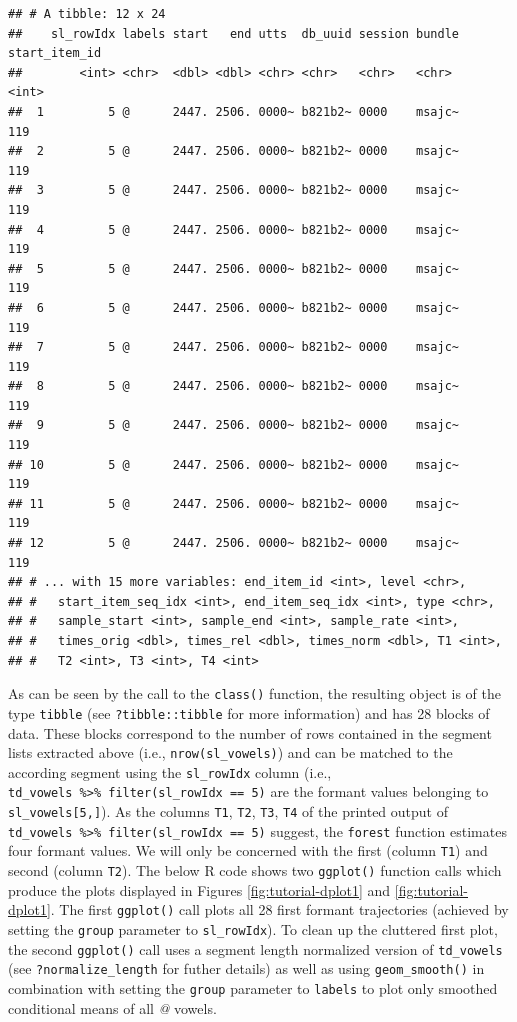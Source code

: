 \documentclass[]{book}
\begin{document}
\begin{verbatim}
## # A tibble: 12 x 24
##    sl_rowIdx labels start   end utts  db_uuid session bundle start_item_id
##        <int> <chr>  <dbl> <dbl> <chr> <chr>   <chr>   <chr>          <int>
##  1         5 @      2447. 2506. 0000~ b821b2~ 0000    msajc~           119
##  2         5 @      2447. 2506. 0000~ b821b2~ 0000    msajc~           119
##  3         5 @      2447. 2506. 0000~ b821b2~ 0000    msajc~           119
##  4         5 @      2447. 2506. 0000~ b821b2~ 0000    msajc~           119
##  5         5 @      2447. 2506. 0000~ b821b2~ 0000    msajc~           119
##  6         5 @      2447. 2506. 0000~ b821b2~ 0000    msajc~           119
##  7         5 @      2447. 2506. 0000~ b821b2~ 0000    msajc~           119
##  8         5 @      2447. 2506. 0000~ b821b2~ 0000    msajc~           119
##  9         5 @      2447. 2506. 0000~ b821b2~ 0000    msajc~           119
## 10         5 @      2447. 2506. 0000~ b821b2~ 0000    msajc~           119
## 11         5 @      2447. 2506. 0000~ b821b2~ 0000    msajc~           119
## 12         5 @      2447. 2506. 0000~ b821b2~ 0000    msajc~           119
## # ... with 15 more variables: end_item_id <int>, level <chr>,
## #   start_item_seq_idx <int>, end_item_seq_idx <int>, type <chr>,
## #   sample_start <int>, sample_end <int>, sample_rate <int>,
## #   times_orig <dbl>, times_rel <dbl>, times_norm <dbl>, T1 <int>,
## #   T2 <int>, T3 <int>, T4 <int>
\end{verbatim}

As can be seen by the call to the \texttt{class()} function, the resulting object is of the type \texttt{tibble} (see \texttt{?tibble::tibble} for more information) and has 28 blocks of data. These blocks correspond to the number of rows contained in the segment lists extracted above (i.e., \texttt{nrow(sl\_vowels)}) and can be matched to the according segment using the \texttt{sl\_rowIdx} column (i.e., \texttt{td\_vowels\ \%\textgreater{}\%\ filter(sl\_rowIdx\ ==\ 5)} are the formant values belonging to \texttt{sl\_vowels{[}5,{]}}). As the columns \texttt{T1}, \texttt{T2}, \texttt{T3}, \texttt{T4} of the printed output of \texttt{td\_vowels\ \%\textgreater{}\%\ filter(sl\_rowIdx\ ==\ 5)} suggest, the \texttt{forest} function estimates four formant values. We will only be concerned with the first (column \texttt{T1}) and second (column \texttt{T2}). The below R code shows two \texttt{ggplot()} function calls which produce the plots displayed in Figures \ref{fig:tutorial-dplot1} and \ref{fig:tutorial-dplot1}. The first \texttt{ggplot()} call plots all 28 first formant trajectories (achieved by setting the \texttt{group} parameter to \texttt{sl\_rowIdx}). To clean up the cluttered first plot, the second \texttt{ggplot()} call uses a segment length normalized version of \texttt{td\_vowels} (see \texttt{?normalize\_length} for futher details) as well as using \texttt{geom\_smooth()} in combination with setting the \texttt{group} parameter to \texttt{labels} to plot only smoothed conditional means of all \emph{@} vowels.
\end{document}

